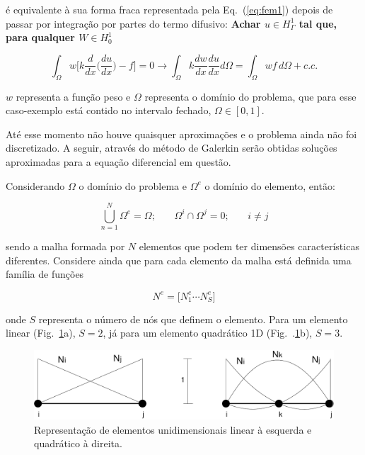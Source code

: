 \noindent é equivalente à sua forma fraca representada pela Eq.~(\ref{eq:fem1}) 
depois de passar por integração por partes do termo difusivo:
\textbf{Achar $u \in H^1_\Gamma$ tal que, para qualquer $W \in H^1_0$}

\begin{equation}
	\int_{\Omega}w \bigg[ k \frac{d}{dx} \bigg( \frac{du}{dx} \bigg) -f
	\bigg]
	= 0 \longrightarrow
	\int_{\Omega} k \frac{dw}{dx} \frac{du}{dx} d\Omega
	= 
	\int_{\Omega} wf \, d\Omega + c.c.
	\label{eq:fem2}
\end{equation}

\noindent $w$ representa a função peso e $\Omega$ representa o domínio
do problema, que para esse caso-exemplo está contido no intervalo
fechado, $\Omega \in [0,1]$.  

Até esse momento não houve quaisquer aproximações e o problema ainda não
foi discretizado.  A seguir, através do método de Galerkin serão 
obtidas soluções aproximadas para a equação diferencial em questão. 

Considerando $\Omega$ o domínio do problema e $\Omega^e$ o domínio do
elemento, então:

\begin{equation}
	\bigcup_{n=1}^{N} \Omega^e 
	= 
	\Omega\text{;}
	\qquad
	\Omega^i \cap \Omega^j = 0\text{;}
	\qquad
	i \neq j
\label{eq:malha1}
\end{equation}\hspace{0.5cm}

\noindent sendo a malha formada por $N$ elementos que podem ter dimensões
características diferentes.  Considere ainda que para cada elemento da
malha está definida uma família de funções 

\begin{equation}
	N^e 
	= 
	\big [ 
	N_1^e \cdots N_S^e 
	\big] 
\label{eq:fem3}
\end{equation}\hspace{0.5cm}

\noindent onde $S$ representa o número de nós que definem o elemento.
Para um elemento linear (Fig.~\ref{fig:elemento1}a), $S=2$, já para um
elemento quadrático 1D (Fig.~.\ref{fig:elemento1}b), $S=3$.  

\begin{figure}[h]
	\centering
		 \includegraphics[scale=0.6]{figs/elem1.pdf}
		 \caption{Representação de elementos unidimensionais linear à
		 esquerda e quadrático à direita.} 
	\label{fig:elemento1}
\end{figure}

